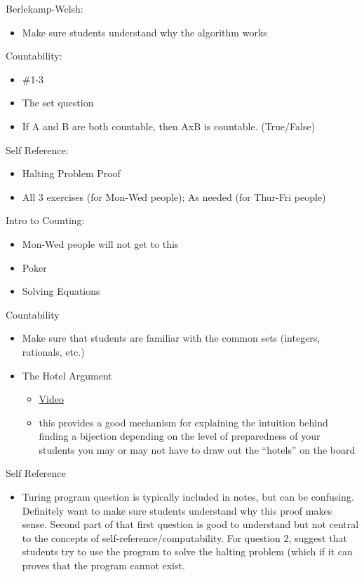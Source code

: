 \documentclass{exam}
\begin{document}
\begin{questions}
\item Berlekamp-Welsh: 
\begin{itemize}
\item Make sure students understand why the algorithm works
\end{itemize}
\item Countability: 
\begin{itemize}
\item \#1-3 
\item The set question
\item If A and B are both countable, then AxB is countable. (True/False)
\end{itemize}
\item Self Reference: 
\begin{itemize}
\item Halting Problem Proof
\item All 3 exercises (for Mon-Wed people); As needed (for Thur-Fri people)
\end{itemize}
\item Intro to Counting: 
\begin{itemize}
\item Mon-Wed people will not get to this
\item Poker
\item Solving Equations
\end{itemize}
\item Countability
\begin{itemize}
\item Make sure that students are familiar with the common sets (integers, rationals, etc.)
\item The Hotel Argument 
\begin{itemize}
\item \href{https://www.youtube.com/watch?v=6NlwpEArfwk&list=PL-XXv-cvA_iD8wQm8U0gG_Z1uHjImKXFy&index=13}{Video}
\item this provides a good mechanism for explaining the intuition behind finding a bijection
depending on the level of preparedness of your students you may or may not have to draw out the “hotels” on the board
\end{itemize}
\end{itemize}
\item Self Reference
\begin{itemize}
\item Turing program question is typically included in notes, but can be confusing. Definitely want to make sure students understand why this proof makes sense. Second part of that first question is good to understand but not central to the concepts of self-reference/computability. For question 2, suggest that students try to use the program to solve the halting problem (which if it can proves that the program cannot exist.

\end{itemize}
\end{questions}
\end{document}
